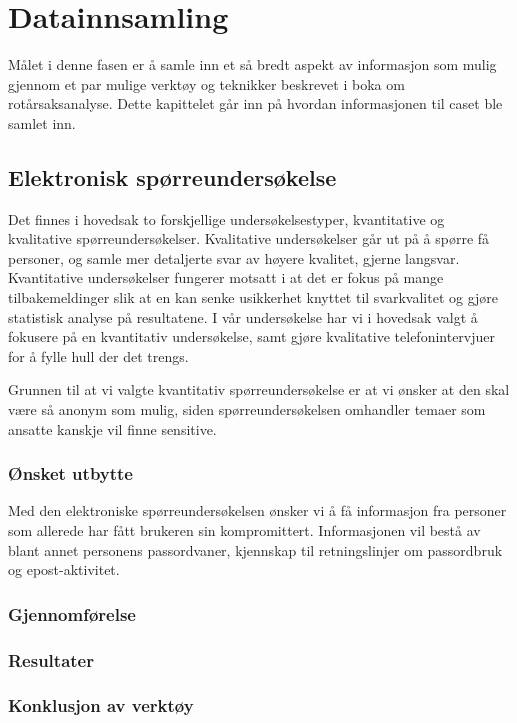 \chapter{Datainnsamling}
Målet i denne fasen er å samle inn et så bredt aspekt av informasjon som mulig gjennom et par mulige verktøy og teknikker beskrevet i boka om rotårsaksanalyse\cite{RCA}. Dette kapittelet går inn på hvordan informasjonen til caset ble samlet inn.



\section{Elektronisk spørreundersøkelse}
Det finnes i hovedsak to forskjellige undersøkelsestyper, kvantitative og kvalitative spørreundersøkelser. Kvalitative undersøkelser går ut på å spørre få personer, og samle mer detaljerte svar av høyere kvalitet, gjerne langsvar. Kvantitative undersøkelser fungerer motsatt i at det er fokus på mange tilbakemeldinger slik at en kan senke usikkerhet knyttet til svarkvalitet og gjøre statistisk analyse på resultatene. I vår undersøkelse har vi i hovedsak valgt å fokusere på en kvantitativ undersøkelse, samt gjøre kvalitative telefonintervjuer for å fylle hull der det trengs.

Grunnen til at vi valgte kvantitativ spørreundersøkelse er at vi ønsker at den skal være så anonym som mulig, siden spørreundersøkelsen omhandler temaer som ansatte kanskje vil finne sensitive. 

\subsection{Ønsket utbytte}
Med den elektroniske spørreundersøkelsen ønsker vi å få informasjon fra personer som allerede har fått brukeren sin kompromittert. Informasjonen vil bestå av blant annet personens passordvaner, kjennskap til retningslinjer om passordbruk og epost-aktivitet. 

\subsection{Gjennomførelse}


\subsection{Resultater}


\subsection{Konklusjon av verktøy}




